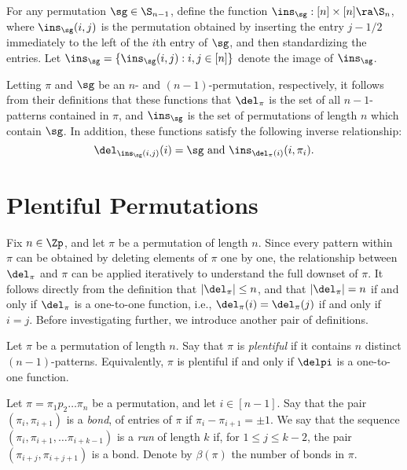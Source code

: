 \documentclass[12pt,twoside]{memoir}
\begin{document}
    \begin{definition} \label{fixpat:def:ins}
      For any permutation $\sg \in \S_{n-1}$, define the function
      $\ins_\sg: [n] \times [n] \ra \S_n$, where $\ins_\sg(i,j)$ is the permutation
      obtained by inserting the entry $j - 1/2$ immediately to the left of the
      $i$th entry of $\sg$, and then standardizing the entries. 
      Let $\ins_\sg = \{\ins_\sg(i,j) : i, j \in [n]\}$ denote the image of
      $\ins_\sg$. 
    \end{definition}

    Letting $\pi$ and $\sg$ be an $n$- and $(n-1)$-permutation, respectively, 
    it follows from their definitions that these functions that $\del_\pi$ is the
    set of all $n-1$-patterns contained in $\pi$, and $\ins_\sg$ is the set of
    permutations of length $n$ which contain $\sg$. In addition, these functions satisfy the
    following inverse relationship:
    $$ \del_{\ins_\sg(i,j)}(i) = \sg \text{ and } \ins_{\del_{\pi}(i)}(i, \pi_i).$$


  \section{Plentiful Permutations}
    
      Fix $n \in \Zp$, and let $\pi$ be a permutation of length $n$. Since every pattern
      within $\pi$ can be obtained by deleting elements of $\pi$ one by one,
      the relationship between $\del_\pi$ and $\pi$ can be applied iteratively to
      understand the full downset of $\pi$. It follows directly from the definition
      that $|\del_\pi| \leq n$, and that $|\del_\pi| = n$ if and only if
      $\del_\pi$ is a one-to-one function, i.e., $\del_\pi(i) = \del_\pi(j)$ if
      and only if $i=j$. Before investigating further, we introduce another pair
      of definitions. 

      \begin{definition} 
      \label{fixpat:def:plentiful}
        Let $\pi$ be a permutation of length $n$. Say that $\pi$ is \emph{plentiful} if it
        contains $n$ distinct $(n-1)$-patterns. Equivalently, $\pi$ is plentiful
        if and only if $\delpi$ is a one-to-one function. 
      \end{definition}
      
      \begin{definition} 
        Let $\pi = \pi_1p_2 \dots \pi_n$ be a permutation, and let $i \in [n-1]$. Say
        that the pair $(\pi_i, \pi_{i+1})$ is a \emph{bond}, of entries of $\pi$ if
        $\pi_i - \pi_{i+1} = \pm 1$. We say that the sequence $(\pi_i, \pi_{i+1}, \dots
        \pi_{i+k-1})$ is a \emph{run} of length $k$ if, for $1 \leq j \leq k-2$,
        the pair $(\pi_{i+j},\pi_{i+j+1})$ is a bond. Denote by $\beta(\pi)$ the
        number of bonds in $\pi$. 
      \end{definition}
    
\end{document}
